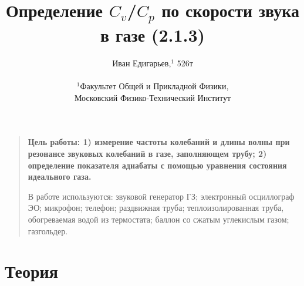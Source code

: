 \documentclass[12pt]{article}
\title{Определение $C_{v}$/$C_{p}$ по скорости звука в газе (2.1.3)}
\author
{Иван Едигарьев,$^{1}$ 526т \\
\\
\normalsize{$^{1}$Факультет Общей и Прикладной Физики,}\\ \normalsize{}{Московский Физико-Технический Институт}\\
}
\date{}
\newenvironment{sciabstract}{%
\begin{quote} \bf}
{\end{quote}}
\begin{document}
 


\baselineskip24pt


\maketitle 




\begin{sciabstract}
Цель работы: 1) измерение частоты колебаний и длины волны при резонансе звуковых колебаний в газе, заполняющем трубу; 2) определение показателя адиабаты с помощью уравнения состояния идеального газа. 

В работе используются: звуковой генератор ГЗ; электронный осциллограф ЭО; микрофон; телефон; раздвижная труба; теплоизолированная труба, обогреваемая водой из термостата; баллон со сжатым углекислым газом; газгольдер. 

\end{sciabstract}




\section*{Теория}
\end{document}
